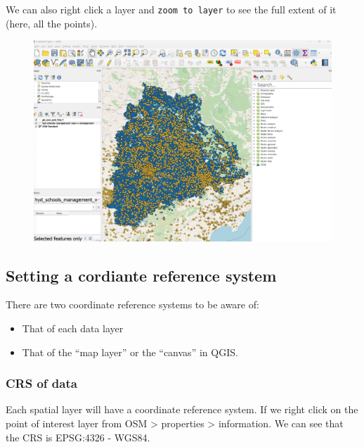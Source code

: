 \documentclass[
  letterpaper,
]{scrbook}
\providecommand{\tightlist}{%
  \setlength{\itemsep}{0pt}\setlength{\parskip}{0pt}}\usepackage{longtable,booktabs,array}
\begin{document}
We can also right click a layer and \texttt{zoom\ to\ layer} to see the
full extent of it (here, all the points).

\begin{figure}

{\centering \includegraphics[width=6.0625in,height=\textheight]{general_images/all_points.png}

}

\end{figure}

\hypertarget{setting-a-cordiante-reference-system}{%
\subsection{Setting a cordiante reference
system}\label{setting-a-cordiante-reference-system}}

There are two coordinate reference systems to be aware of:

\begin{itemize}
\tightlist
\item
  That of each data layer
\item
  That of the ``map layer'' or the ``canvas'' in QGIS.
\end{itemize}

\hypertarget{crs-of-data}{%
\subsubsection{CRS of data}\label{crs-of-data}}

Each spatial layer will have a coordinate reference system. If we right
click on the point of interest layer from OSM \textgreater{} properties
\textgreater{} information. We can see that the CRS is EPSG:4326 -
WGS84.
\end{document}

